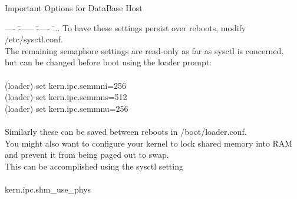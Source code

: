 \documentclass[xcolor=dvipsnames]{beamer}
\begin{document}
	\begin{frame}{Important Options for DataBase Host}
	\scriptsize
	{
		\begin{tabbing}
		---- \= ------ \= ----- \= ... \kill
	    To have these settings persist over reboots, modify /etc/sysctl.conf. \\
		The remaining semaphore settings are read-only as far as sysctl is concerned, \\
		but can be changed before boot using the loader prompt: \\ \\
		
		\>(loader) set kern.ipc.semmni=256\\
		\>(loader) set kern.ipc.semmns=512\\
		\>(loader) set kern.ipc.semmnu=256\\ \\

		Similarly these can be saved between reboots in /boot/loader.conf. \\
		You might also want to configure your kernel to lock shared memory into RAM \\
		and prevent it from being paged out to swap. \\
		This can be accomplished using the sysctl setting \\ \\
		
		\> kern.ipc.shm\_use\_phys \\ \\
		
		\end{tabbing}
	}
	\end{frame}
\end{document}
